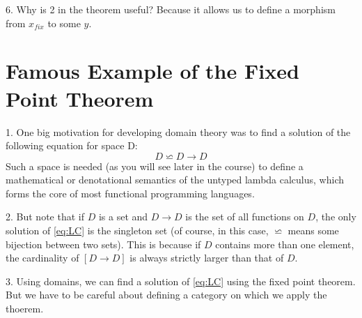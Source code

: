 \documentclass{report}[12pt]
\begin{document}
6. Why is 2 in the theorem useful? Because it allows us to define a morphism from $x_{fix}$ to some $y$.

\section{Famous Example of the Fixed Point Theorem}
1. One big motivation for developing domain theory was to find a solution of the following equation for space D:
\begin{equation} \label{eq:LC}
  D \backsimeq D \rightarrow D
\end{equation}
Such a space is needed (as you will see later in the course) to define a mathematical or denotational semantics of the untyped lambda calculus, which forms the core of most functional programming languages.

2. But note that if $D$ is a set and $D\rightarrow D$ is the set of all functions on $D$, the only solution of \eqref{eq:LC} is the singleton set (of course, in this case, $\backsimeq$ means some bijection between two sets). This is because if $D$ contains more than one element, the cardinality of $[D\rightarrow D]$ is always strictly larger than that of $D$.

3. Using domains, we can find a solution of \eqref{eq:LC} using the fixed point theorem. But we have to be careful about defining a category on which we apply the thoerem.
\end{document}
